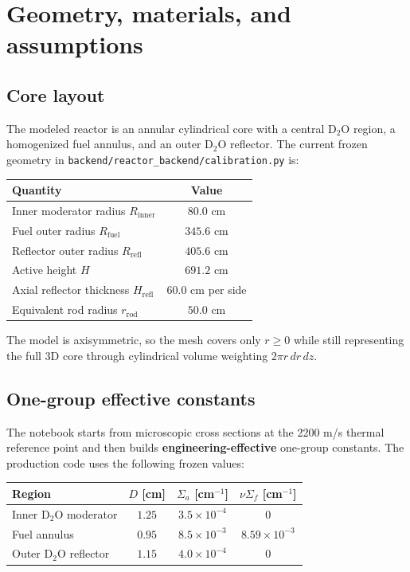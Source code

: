 \documentclass[11pt]{article}
\begin{document}
\section{Geometry, materials, and assumptions}

\subsection{Core layout}

The modeled reactor is an annular cylindrical core with a central D$_2$O region,
a homogenized fuel annulus, and an outer D$_2$O reflector.  The current frozen
geometry in \texttt{backend/reactor\_backend/}\linebreak\texttt{calibration.py}
is:

\begin{center}
\begin{tabular}{lc}
\toprule
Quantity & Value \\
\midrule
Inner moderator radius $R_{\mathrm{inner}}$ & $80.0$ cm \\
Fuel outer radius $R_{\mathrm{fuel}}$ & $345.6$ cm \\
Reflector outer radius $R_{\mathrm{refl}}$ & $405.6$ cm \\
Active height $H$ & $691.2$ cm \\
Axial reflector thickness $H_{\mathrm{refl}}$ & $60.0$ cm per side \\
Equivalent rod radius $r_{\mathrm{rod}}$ & $50.0$ cm \\
\bottomrule
\end{tabular}
\end{center}

The model is axisymmetric, so the mesh covers only $r \ge 0$ while still
representing the full 3D core through cylindrical volume weighting
$2\pi r\,dr\,dz$.

\subsection{One-group effective constants}

The notebook starts from microscopic cross sections at the 2200 m/s thermal
reference point and then builds \textbf{engineering-effective} one-group
constants.  The production code uses the following frozen values:

\begin{center}
\begin{tabular}{lccc}
\toprule
Region & $D$ [cm] & $\Sigma_a$ [cm$^{-1}$] & $\nu\Sigma_f$ [cm$^{-1}$] \\
\midrule
Inner D$_2$O moderator & $1.25$ & $3.5\times 10^{-4}$ & $0$ \\
Fuel annulus & $0.95$ & $8.5\times 10^{-3}$ & $8.59\times 10^{-3}$ \\
Outer D$_2$O reflector & $1.15$ & $4.0\times 10^{-4}$ & $0$ \\
\bottomrule
\end{tabular}
\end{center}
\end{document}
